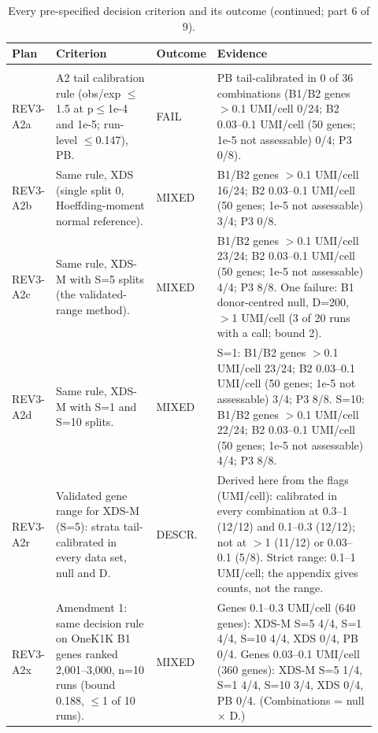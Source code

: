 \begin{table}[p]
\centering\scriptsize
\setlength{\tabcolsep}{2.5pt}\renewcommand{\arraystretch}{1.1}
\caption{Every pre-specified decision criterion and its outcome (continued; part 6 of 9).}\label{tab:criteria6}
\begin{tabular}{@{}>{\raggedright\arraybackslash}p{0.100\linewidth}>{\raggedright\arraybackslash}p{0.285\linewidth}>{\raggedright\arraybackslash}p{0.085\linewidth}>{\raggedright\arraybackslash}p{0.450\linewidth}@{}}
\toprule
Plan & Criterion & Outcome & Evidence \\
\midrule
\multicolumn{4}{@{}>{\raggedright\arraybackslash}p{0.90\linewidth}}{\textbf{Plan 4 (REV3\_PREREG), with amendment 1} (continued)} \\
\cmidrule(lr){1-4}
REV3-A2a & A2 tail calibration rule (obs/exp $\le$1.5 at p$\le$1e-4 and 1e-5; run-level $\le$0.147), PB. & FAIL & PB tail-calibrated in 0 of 36 combinations (B1/B2 genes $>$0.1 UMI/cell 0/24; B2 0.03--0.1 UMI/cell (50 genes; 1e-5 not assessable) 0/4; P3 0/8). \\
REV3-A2b & Same rule, XDS (single split 0, Hoeffding-moment normal reference). & MIXED & B1/B2 genes $>$0.1 UMI/cell 16/24; B2 0.03--0.1 UMI/cell (50 genes; 1e-5 not assessable) 3/4; P3 0/8. \\
REV3-A2c & Same rule, XDS-M with S=5 splits (the validated-range method). & MIXED & B1/B2 genes $>$0.1 UMI/cell 23/24; B2 0.03--0.1 UMI/cell (50 genes; 1e-5 not assessable) 4/4; P3 8/8. One failure: B1 donor-centred null, D=200, $>$1 UMI/cell (3 of 20 runs with a call; bound 2). \\
REV3-A2d & Same rule, XDS-M with S=1 and S=10 splits. & MIXED & S=1: B1/B2 genes $>$0.1 UMI/cell 23/24; B2 0.03--0.1 UMI/cell (50 genes; 1e-5 not assessable) 3/4; P3 8/8. S=10: B1/B2 genes $>$0.1 UMI/cell 22/24; B2 0.03--0.1 UMI/cell (50 genes; 1e-5 not assessable) 4/4; P3 8/8. \\
REV3-A2r & Validated gene range for XDS-M (S=5): strata tail-calibrated in every data set, null and D. & DESCR. & Derived here from the flags (UMI/cell): calibrated in every combination at 0.3--1 (12/12) and 0.1--0.3 (12/12); not at $>$1 (11/12) or 0.03--0.1 (5/8). Strict range: 0.1--1 UMI/cell; the appendix gives counts, not the range. \\
REV3-A2x & Amendment 1: same decision rule on OneK1K B1 genes ranked 2,001--3,000, n=10 runs (bound 0.188, $\le$1 of 10 runs). & MIXED & Genes 0.1--0.3 UMI/cell (640 genes): XDS-M S=5 4/4, S=1 4/4, S=10 4/4, XDS 0/4, PB 0/4. Genes 0.03--0.1 UMI/cell (360 genes): XDS-M S=5 1/4, S=1 4/4, S=10 3/4, XDS 0/4, PB 0/4. (Combinations = null $\times$ D.) \\

\end{tabular}
\end{table}
